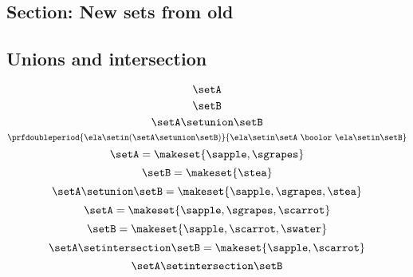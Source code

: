 \begin{forslides}
 \subsection{Section: New sets from old}   
 
 \subsection{Unions and intersection}
 
%
 \begin{equation}\label{eq:slides_session2_1}
\setA
\end{equation}
\begin{equation}\label{eq:slides_session2_2}
\setB
\end{equation}
 \begin{equation}\label{eq:slides_session2_3}
\setA \setunion \setB
\end{equation}
\begin{equation}\label{eq:slides_session2_4}
\prfdoubleperiod
    {\ela \setin(\setA \setunion \setB)}{\ela \setin\setA \ \boolor\  \ela \setin\setB}
\end{equation}
 \begin{equation}\label{eq:slides_session2_5}
\setA = \makeset{ \sapple, \sgrapes }
\end{equation}
\begin{equation}\label{eq:slides_session2_6}
\setB = \makeset{ \stea }
\end{equation}
 \begin{equation}\label{eq:slides_session2_7}
\setA \setunion \setB = \makeset{ \sapple, \sgrapes, \stea }
\end{equation}
\begin{equation}\label{eq:slides_session2_8}
\setA = \makeset{ \sapple, \sgrapes, \scarrot }
\end{equation}
 \begin{equation}\label{eq:slides_session2_9}
\setB = \makeset{ \sapple, \scarrot, \swater }
\end{equation}
 \begin{equation}\label{eq:slides_session2_10}
\setA \setintersection \setB = \makeset{ \sapple, \scarrot }
\end{equation}
 \begin{equation}\label{eq:slides_session2_11}
\setA \setintersection \setB
\end{equation}

\end{forslides}
